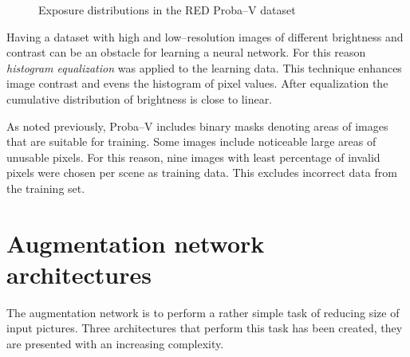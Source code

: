 \begin{figure}
        \centering
    \caption{Exposure distributions in the RED Proba--V dataset}
    \label{fig:exposure-dist-red}
\end{figure}


Having a dataset with high and low--resolution images of different brightness and contrast can be an obstacle for learning a neural network.
For this reason \textit{histogram equalization} was applied to the learning data.
This technique enhances image contrast and evens the histogram of pixel values.
After equalization the cumulative distribution of brightness is close to linear.

As noted previously, Proba--V includes binary masks denoting areas of images that are suitable for training.
Some images include noticeable large areas of unusable pixels.
For this reason, nine images with least percentage of invalid pixels were chosen per scene as training data.
This excludes incorrect data from the training set.  

\section{Augmentation network architectures}
The augmentation network is to perform a rather simple task of reducing size of input pictures.
Three architectures that perform this task has been created, they are presented with an increasing complexity.

